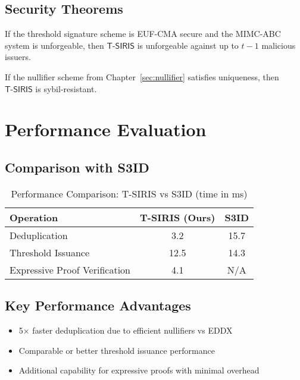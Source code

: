 \subsection{Security Theorems}
\begin{theorem}[Unforgeability]
If the threshold signature scheme is EUF-CMA secure and the MIMC-ABC system is unforgeable, then $\mathsf{T\text{-}SIRIS}$ is unforgeable against up to $t-1$ malicious issuers.
\end{theorem}

\begin{theorem}
If the nullifier scheme from Chapter~\ref{sec:nullifier} satisfies uniqueness, then $\mathsf{T\text{-}SIRIS}$ is sybil-resistant.
\end{theorem}

\section{Performance Evaluation}
\label{sec:threshold-performance}

\subsection{Comparison with S3ID}
\begin{table}[h]
    \centering
    \caption{Performance Comparison: T-SIRIS vs S3ID (time in ms)}
    \begin{tabular}{lcc}
        \toprule
        \textbf{Operation} & \textbf{T-SIRIS (Ours)} & \textbf{S3ID} \\
        \midrule
        Deduplication & 3.2 & 15.7 \\
        Threshold Issuance & 12.5 & 14.3 \\
        Expressive Proof Verification & 4.1 & N/A \\
        \bottomrule
    \end{tabular}
\end{table}

\subsection{Key Performance Advantages}
\begin{itemize}
    \item 5× faster deduplication due to efficient nullifiers vs EDDX
    \item Comparable or better threshold issuance performance
    \item Additional capability for expressive proofs with minimal overhead
\end{itemize}

